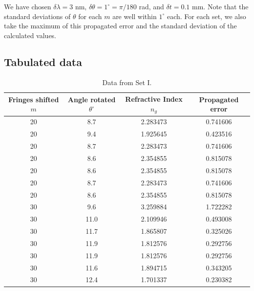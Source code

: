 \documentclass[11pt]{article}
\begin{document}
        We have chosen $\delta\lambda = 3$ nm, $\delta\theta = 1^\circ = \pi/180$ rad, and $\delta t = 0.1$ mm. 
        Note that the standard deviations of $\theta$ for each $m$ are well within $1^\circ$ each.
        For each set, we also take the maximum of this propagated error and the standard deviation of the calculated values.

        \subsection{Tabulated data}

        \begin{table}[H]
                \centering
                \caption{Data from Set I.}
                \begin{tabular}{c|c|c|c}\hline
                Fringes shifted $m$&  Angle rotated $\theta^\circ$ &  Refractive Index $n_g$&     Propagated error \\\hline\hline
                    20 &            8.7 &          2.283473 &  0.741606 \\
                    20 &            9.4 &          1.925645 &  0.423516 \\
                    20 &            8.7 &          2.283473 &  0.741606 \\
                    20 &            8.6 &          2.354855 &  0.815078 \\
                    20 &            8.6 &          2.354855 &  0.815078 \\
                    20 &            8.7 &          2.283473 &  0.741606 \\
                    20 &            8.6 &          2.354855 &  0.815078 \\
                    \color{red}30 &           \color{red} 9.6 &       \color{red}   3.259884 &  \color{red}1.722282 \\
                    30 &           11.0 &          2.109946 &  0.493008 \\
                    30 &           11.7 &          1.865807 &  0.325026 \\
                    30 &           11.9 &          1.812576 &  0.292756 \\
                    30 &           11.9 &          1.812576 &  0.292756 \\
                    30 &           11.6 &          1.894715 &  0.343205 \\
                    30 &           12.4 &          1.701337 &  0.230382 \\

\end{tabular}
\end{table}
\end{document}
